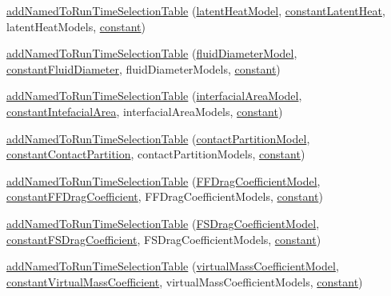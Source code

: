\begin{DoxyCompactItemize}
\hyperlink{namespaceFoam_a5718ea45487a7ca0bfcd1e1cb265ec33}{add\+Named\+To\+Run\+Time\+Selection\+Table} (\hyperlink{classFoam_1_1latentHeatModel}{latent\+Heat\+Model}, \hyperlink{namespaceFoam_af68e9abc0c6b136c3e34c66d816fb3a1}{constant\+Latent\+Heat}, latent\+Heat\+Models, \hyperlink{classFoam_1_1constant}{constant})
\item 
\hyperlink{namespaceFoam_a124e5735d2ec5c9c89a0ff517365d6b7}{add\+Named\+To\+Run\+Time\+Selection\+Table} (\hyperlink{classFoam_1_1fluidDiameterModel}{fluid\+Diameter\+Model}, \hyperlink{namespaceFoam_a9b1f75fec8c575083695f6c9e80234cf}{constant\+Fluid\+Diameter}, fluid\+Diameter\+Models, \hyperlink{classFoam_1_1constant}{constant})
\item 
\hyperlink{namespaceFoam_a0f804916ef1e60488fc86cdd534c4364}{add\+Named\+To\+Run\+Time\+Selection\+Table} (\hyperlink{classFoam_1_1interfacialAreaModel}{interfacial\+Area\+Model}, \hyperlink{namespaceFoam_a67d7b55001a14e8c5b32e3548c7cbc73}{constant\+Intefacial\+Area}, interfacial\+Area\+Models, \hyperlink{classFoam_1_1constant}{constant})
\item 
\hyperlink{namespaceFoam_ab239e2737945a4d2ca96aebd29c17ec8}{add\+Named\+To\+Run\+Time\+Selection\+Table} (\hyperlink{classFoam_1_1contactPartitionModel}{contact\+Partition\+Model}, \hyperlink{namespaceFoam_a52a37eca9ce7726c3c7b8c585ac45fec}{constant\+Contact\+Partition}, contact\+Partition\+Models, \hyperlink{classFoam_1_1constant}{constant})
\item 
\hyperlink{namespaceFoam_a8d7730aa60088cc41aa0760ac5d05179}{add\+Named\+To\+Run\+Time\+Selection\+Table} (\hyperlink{classFoam_1_1FFDragCoefficientModel}{F\+F\+Drag\+Coefficient\+Model}, \hyperlink{namespaceFoam_af1318ccc11265440ed0af331cb695819}{constant\+F\+F\+Drag\+Coefficient}, F\+F\+Drag\+Coefficient\+Models, \hyperlink{classFoam_1_1constant}{constant})
\item 
\hyperlink{namespaceFoam_a1a65520640158e3b7680e461eddd7f4a}{add\+Named\+To\+Run\+Time\+Selection\+Table} (\hyperlink{classFoam_1_1FSDragCoefficientModel}{F\+S\+Drag\+Coefficient\+Model}, \hyperlink{namespaceFoam_a45a431a6ad4bd9b4663987ce40f64f3e}{constant\+F\+S\+Drag\+Coefficient}, F\+S\+Drag\+Coefficient\+Models, \hyperlink{classFoam_1_1constant}{constant})
\item 
\hyperlink{namespaceFoam_a28207b73a6e7d8a6ae42220404fa6ed0}{add\+Named\+To\+Run\+Time\+Selection\+Table} (\hyperlink{classFoam_1_1virtualMassCoefficientModel}{virtual\+Mass\+Coefficient\+Model}, \hyperlink{namespaceFoam_a3ed635b90e17336f27203e329ff4691e}{constant\+Virtual\+Mass\+Coefficient}, virtual\+Mass\+Coefficient\+Models, \hyperlink{classFoam_1_1constant}{constant})

\end{DoxyCompactItemize}
